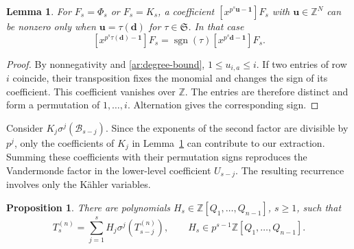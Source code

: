 \documentclass[11pt]{amsart}
\newtheorem{lemma}[theorem]{Lemma}
\newtheorem{proposition}[theorem]{Proposition}
\theoremstyle{definition}
\theoremstyle{remark}
\numberwithin{equation}{section}
\newcommand{\Z}{\mathbb Z}
\begin{document}
\begin{lemma}\label{ar:orbit}
For $F_s=\Phi_s$ or $F_s=K_s$, a coefficient
$[x^{p^s\boldsymbol u-\mathbf1}]F_s$ with
$\boldsymbol u\in\Z^N$ can be nonzero only when
$\boldsymbol u=\tau(\mathbf d)$ for $\tau\in\mathfrak S$. In that case
\[
 [x^{p^s\tau(\mathbf d)-\mathbf1}]F_s
 =\operatorname{sgn}(\tau)
   [x^{p^s\mathbf d-\mathbf1}]F_s.
\]
\end{lemma}

\begin{proof}
By nonnegativity and \eqref{ar:degree-bound},
$1\leq u_{i,a}\leq i$. If two entries of row $i$ coincide,
their transposition fixes the monomial and changes the sign of
its coefficient. This coefficient vanishes over $\Z$.
The entries are therefore distinct and form a permutation of
$1,\ldots,i$. Alternation gives the corresponding sign.
\end{proof}

Consider $K_j\sigma^j(\mathcal B_{s-j})$. Since the exponents
of the second factor are divisible by $p^j$, only the coefficients
of $K_j$ in Lemma~\ref{ar:orbit} can contribute to our extraction.
Summing these coefficients with their permutation signs
reproduces the Vandermonde factor in the lower-level
coefficient $U_{s-j}$. The resulting recurrence involves only
the K\"ahler variables.

\begin{proposition}\label{ar:scalar-ghosts}
There are polynomials $H_s\in\Z[Q_1,\ldots,Q_{n-1}]$, $s\geq1$, such
that
\begin{equation}\label{ar:T-ghost-recursion}
 T_s^{(n)}=\sum_{j=1}^s H_j\sigma^j(T_{s-j}^{(n)}),
 \qquad H_s\in p^{s-1}\Z[Q_1,\ldots,Q_{n-1}].
\end{equation}
\end{proposition}
\end{document}
